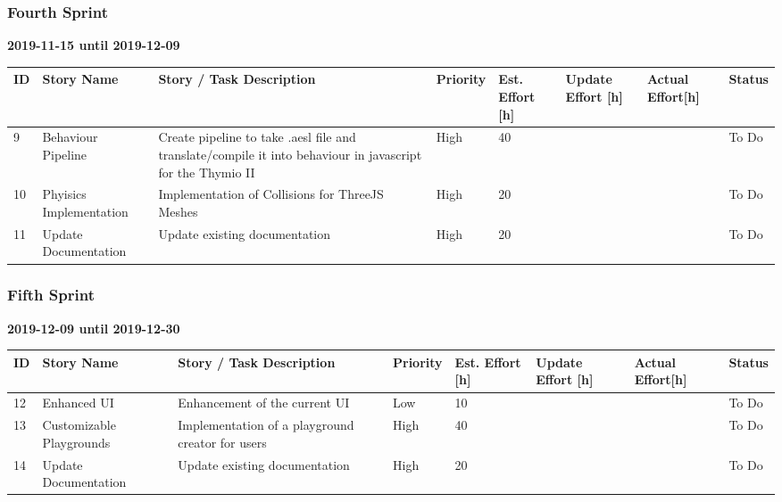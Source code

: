 \documentclass{scrartcl}
\begin{document}
\subsubsection{Fourth Sprint}
\textbf{2019-11-15 until 2019-12-09}
\begin{longtable}{p{5mm}|p{2cm}|p{4cm}|p{1cm}|p{1cm}|p{1cm}|p{1cm}|p{15mm}}
  ID                     & Story Name & Story / Task Description & Priority & Est. Effort {[}h{]} & Update Effort {[}h{]} & Actual Effort{[}h{]} & Status                \\ \hline
  9 & Behaviour Pipeline & Create pipeline to take .aesl file and translate/compile it into behaviour in javascript for the Thymio II & High & 40 &  &  & To Do \\ 
  10 & Phyisics Implementation & Implementation of Collisions for ThreeJS Meshes & High & 20 &  &  & To Do \\
  11 & Update Documentation & Update existing documentation & High & 20 &  &  & To Do \\ 
\end{longtable}

\subsubsection{Fifth Sprint}
\textbf{2019-12-09 until 2019-12-30}
\begin{longtable}{p{5mm}|p{2cm}|p{4cm}|p{1cm}|p{1cm}|p{1cm}|p{1cm}|p{15mm}}
  ID                     & Story Name & Story / Task Description & Priority & Est. Effort {[}h{]} & Update Effort {[}h{]} & Actual Effort{[}h{]} & Status                \\ \hline
  12 & Enhanced UI & Enhancement of the current UI & Low & 10 &  &  & To Do \\ 
  13 & Customizable Playgrounds & Implementation of a playground creator for users & High & 40 &  &  & To Do \\ 
  14 & Update Documentation & Update existing documentation & High & 20 &  &  & To Do \\ 
\end{longtable}
\end{document}
